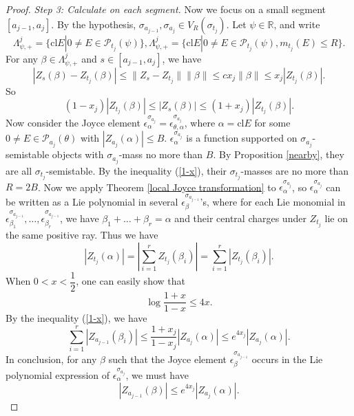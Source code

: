 \documentclass[a4paper,12pt]{amsart}
\numberwithin{equation}{section}
\newcommand{\cl}{\mathrm{cl}}
\newcommand{\1}{\mathbf{1}}
\begin{document}
\begin{proof}
    \emph{Step 3: Calculate on each segment.} Now we focus on a small segment $[a_{j-1},a_j]$. By the hypothesis, $\sigma_{a_{j-1}},\sigma_{a_j}\in V_R(\sigma_{t_j})$. Let $\psi\in\mathbb{R}$, and write
    \[\Lambda^j_{\psi,+}=\{\cl E|0\neq E\in\mathcal{P}_{t_j}(\psi)\},\Lambda^j_{\psi,+}=\{\cl E|0\neq E\in\mathcal{P}_{t_j}(\psi),m_{t_j}(E)\leqslant R\}.\]
    For any $\beta\in\Lambda^j_{\psi,+}$ and $s\in[a_{j-1},a_j]$, we have
    \[|Z_s(\beta)-Z_{t_j}(\beta)|\leqslant\|Z_s-Z_{t_j}\|\|\beta\|\leqslant cx_j\|\beta\|\leqslant x_j|Z_{t_j}(\beta)|.\]
    So
    \begin{equation}\label{1-x}
        (1-x_j)|Z_{t_j}(\beta)|\leqslant|Z_s(\beta)|\leqslant(1+x_j)|Z_{t_j}(\beta)|.
    \end{equation}
    Now consider the Joyce element $\epsilon^{\sigma_{a_j}}_\alpha=\epsilon^{\sigma_{a_j}}_{\theta,\alpha}$, where $\alpha=\cl E$ for some $0\neq E\in\mathcal{P}_{a_j}(\theta)$ with $|Z_{a_j}(\alpha)|\leqslant B$. $\epsilon^{\sigma_{a_j}}_\alpha$ is a function supported on $\sigma_{a_j}$-semistable objects with $\sigma_{a_j}$-mass no more than $B$. By Proposition \ref{nearby}, they are all $\sigma_{t_j}$-semistable. By the inequality (\ref{1-x}), their $\sigma_{t_j}$-masses are no more than $R=2B$. Now we apply Theorem \ref{local Joyce transformation} to $\epsilon^{\sigma_{a_j}}_\alpha$, so $\epsilon^{\sigma_{a_j}}_\alpha$ can be written as a Lie polynomial in several $\epsilon^{\sigma_{a_{j-1}}}_{\beta}$'s, where for each Lie monomial in $\epsilon^{\sigma_{a_{j-1}}}_{\beta_1},\dots,\epsilon^{\sigma_{a_{j-1}}}_{\beta_r}$, we have $\beta_1+\dots+\beta_r=\alpha$ and their central charges under $Z_{t_j}$ lie on the same positive ray. Thus we have
    \[|Z_{{t_j}}(\alpha)|=\left|\sum_{i=1}^r Z_{{t_j}}(\beta_i)\right|=\sum_{i=1}^r|Z_{{t_j}}(\beta_i)|.\]
    When $0<x<\dfrac{1}{2}$, one can easily show that
    \[\log\dfrac{1+x}{1-x}\leqslant 4x.\]
    By the inequality (\ref{1-x}), we have
    \[\sum_{i=1}^r|Z_{{a_{j-1}}}(\beta_i)|\leqslant\dfrac{1+x_j}{1-x_j}|Z_{{a_j}}(\alpha)|\leqslant e^{4x_j}|Z_{{a_j}}(\alpha)|.\]
    In conclusion, for any $\beta$ such that the Joyce element $\epsilon^{\sigma_{a_{j-1}}}_\beta$ occurs in the Lie polynomial expression of $\epsilon^{\sigma_{a_j}}_\alpha$, we must have
    \begin{equation}\label{e^4x}
        |Z_{{a_{j-1}}}(\beta)|\leqslant e^{4x_j}|Z_{{a_j}}(\alpha)|.
    \end{equation}


\end{proof}
\end{document}
